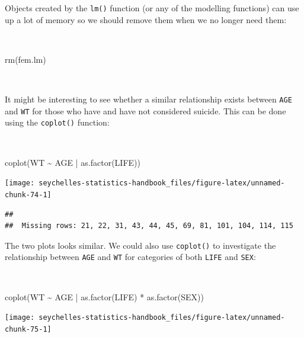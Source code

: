 \documentclass[
  12pt,
]{book}
\newenvironment{Shaded}{\begin{snugshade}}{\end{snugshade}}
\newcommand{\FunctionTok}[1]{\textcolor[rgb]{0.00,0.00,0.00}{#1}}
\newcommand{\NormalTok}[1]{#1}
\newcommand{\SpecialCharTok}[1]{\textcolor[rgb]{0.00,0.00,0.00}{#1}}
\begin{document}
Objects created by the \texttt{lm()} function (or any of the modelling functions) can use up a lot of memory so we should remove them when we no longer need them:

~

\begin{Shaded}
\begin{Highlighting}[]
\FunctionTok{rm}\NormalTok{(fem.lm)}
\end{Highlighting}
\end{Shaded}

~

It might be interesting to see whether a similar relationship exists between \texttt{AGE} and \texttt{WT} for those who have and have not considered suicide. This can be done using the \texttt{coplot()} function:

~

\begin{Shaded}
\begin{Highlighting}[]
\FunctionTok{coplot}\NormalTok{(WT }\SpecialCharTok{\textasciitilde{}}\NormalTok{ AGE }\SpecialCharTok{|} \FunctionTok{as.factor}\NormalTok{(LIFE))}
\end{Highlighting}
\end{Shaded}

\begin{center}\texttt{[image: seychelles-statistics-handbook\_files/figure-latex/unnamed-chunk-74-1]} \end{center}

\begin{verbatim}
## 
##  Missing rows: 21, 22, 31, 43, 44, 45, 69, 81, 101, 104, 114, 115
\end{verbatim}

\newpage

The two plots looks similar. We could also use \texttt{coplot()} to investigate the relationship between \texttt{AGE} and \texttt{WT} for categories of both \texttt{LIFE} and \texttt{SEX}:

~

\begin{Shaded}
\begin{Highlighting}[]
\FunctionTok{coplot}\NormalTok{(WT }\SpecialCharTok{\textasciitilde{}}\NormalTok{ AGE }\SpecialCharTok{|} \FunctionTok{as.factor}\NormalTok{(LIFE) }\SpecialCharTok{*} \FunctionTok{as.factor}\NormalTok{(SEX))}
\end{Highlighting}
\end{Shaded}

\begin{center}\texttt{[image: seychelles-statistics-handbook\_files/figure-latex/unnamed-chunk-75-1]} \end{center}
\end{document}
